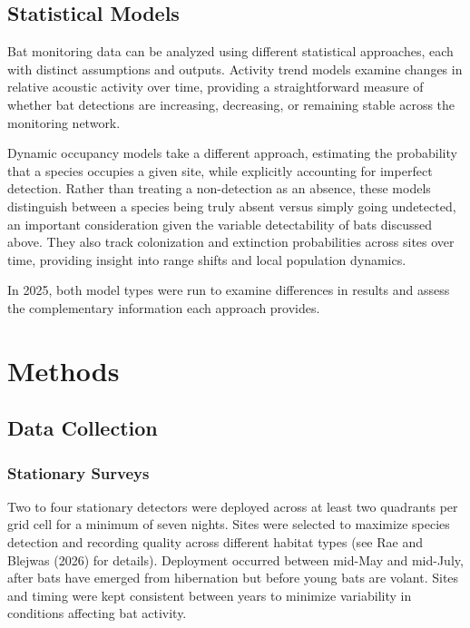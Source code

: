 \documentclass[
  letterpaper,
  DIV=11,
  numbers=noendperiod]{scrartcl}
\begin{document}
\subsection{Statistical Models}\label{statistical-models}

Bat monitoring data can be analyzed using different statistical
approaches, each with distinct assumptions and outputs. Activity trend
models examine changes in relative acoustic activity over time,
providing a straightforward measure of whether bat detections are
increasing, decreasing, or remaining stable across the monitoring
network.

Dynamic occupancy models take a different approach, estimating the
probability that a species occupies a given site, while explicitly
accounting for imperfect detection. Rather than treating a non-detection
as an absence, these models distinguish between a species being truly
absent versus simply going undetected, an important consideration given
the variable detectability of bats discussed above. They also track
colonization and extinction probabilities across sites over time,
providing insight into range shifts and local population dynamics.

In 2025, both model types were run to examine differences in results and
assess the complementary information each approach provides.

\section{Methods}\label{methods}

\subsection{Data Collection}\label{data-collection}

\subsubsection{Stationary Surveys}\label{stationary-surveys}

Two to four stationary detectors were deployed across at least two
quadrants per grid cell for a minimum of seven nights. Sites were
selected to maximize species detection and recording quality across
different habitat types (see Rae and Blejwas (2026) for details).
Deployment occurred between mid-May and mid-July, after bats have
emerged from hibernation but before young bats are volant. Sites and
timing were kept consistent between years to minimize variability in
conditions affecting bat activity.
\end{document}
